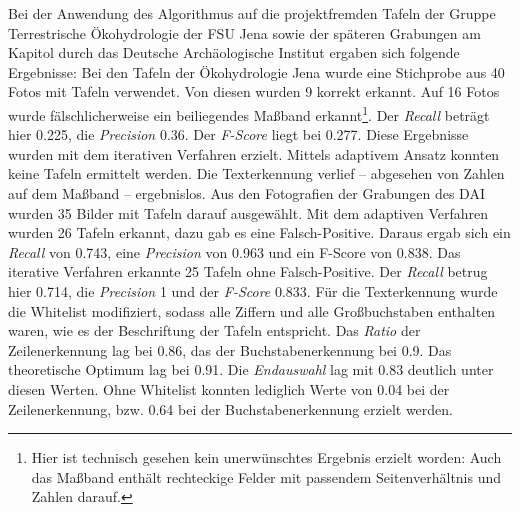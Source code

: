 Bei der Anwendung des Algorithmus auf die projektfremden Tafeln der Gruppe Terrestrische Ökohydrologie der FSU Jena sowie der späteren Grabungen am Kapitol durch das Deutsche Archäologische Institut ergaben sich folgende Ergebnisse:
Bei den Tafeln der Ökohydrologie Jena wurde eine Stichprobe aus 40 Fotos mit Tafeln verwendet. Von diesen wurden 9 korrekt erkannt. Auf 16 Fotos wurde fälschlicherweise ein beiliegendes Maßband erkannt\footnote{Hier ist technisch gesehen kein unerwünschtes Ergebnis erzielt worden: Auch das Maßband enthält rechteckige Felder mit passendem Seitenverhältnis und Zahlen darauf.}. Der \textit{Recall} beträgt hier 0.225, die \textit{Precision} 0.36. Der \textit{F-Score} liegt bei 0.277. Diese Ergebnisse wurden mit dem iterativen Verfahren erzielt. Mittels adaptivem Ansatz konnten keine Tafeln ermittelt werden. Die Texterkennung verlief -- abgesehen von Zahlen auf dem Maßband -- ergebnislos.
Aus den Fotografien der Grabungen des DAI wurden 35 Bilder mit Tafeln darauf ausgewählt. Mit dem adaptiven Verfahren wurden 26 Tafeln erkannt, dazu gab es eine Falsch-Positive. Daraus ergab sich ein \textit{Recall} von 0.743, eine \textit{Precision} von 0.963 und ein {F-Score} von 0.838. Das iterative Verfahren erkannte 25 Tafeln ohne Falsch-Positive. Der \textit{Recall} betrug hier 0.714, die \textit{Precision} 1 und der \textit{F-Score} 0.833.
Für die Texterkennung wurde die Whitelist modifiziert, sodass alle Ziffern und alle Großbuchstaben enthalten waren, wie es der Beschriftung der Tafeln entspricht. Das \textit{Ratio} der Zeilenerkennung lag bei 0.86, das der Buchstabenerkennung bei 0.9. Das theoretische Optimum lag bei 0.91. Die \textit{Endauswahl} lag mit 0.83 deutlich unter diesen Werten. Ohne Whitelist konnten lediglich Werte von 0.04 bei der Zeilenerkennung, bzw. 0.64 bei der Buchstabenerkennung erzielt werden.
